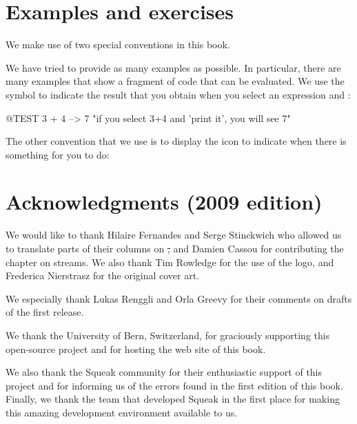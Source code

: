 \documentclass[a4paper,10pt,twoside]{book}
\begin{document}
\section*{Examples and exercises}

We make use of two special conventions in this book.

We have tried to provide as many examples as possible.
In particular, there are many examples that show a fragment of code that can be evaluated.
We use the symbol \ct{-->} to indicate the result that you obtain when you select an expression and :

\begin{code}{@TEST}
3 + 4 --> 7    "if you select 3+4 and 'print it', you will see 7"
\end{code}


The other convention that we use is to display the icon \dothisicon{} to indicate when there is something for you to do:


\section*{Acknowledgments (2009 edition)}

We would like to thank Hilaire Fernandes and Serge Stinckwich who allowed us to translate parts of their columns on \st, and Damien Cassou for contributing the chapter on streams.
We also thank Tim Rowledge for the use of the \sq logo, and Frederica Nierstrasz for the original cover art.

We especially thank Lukas Renggli and Orla Greevy for their comments on drafts of the first release.

We thank the University of Bern, Switzerland, for graciously supporting this open-source project and for hosting the web site of this book.

We also thank the Squeak community for their enthusiastic support of this project and for informing us of the errors found in the first edition of this book.
Finally, we thank the team that developed Squeak in the first place for making this amazing development environment available to us.

\ifx\wholebook\relax\else
   
   
\end{document}
